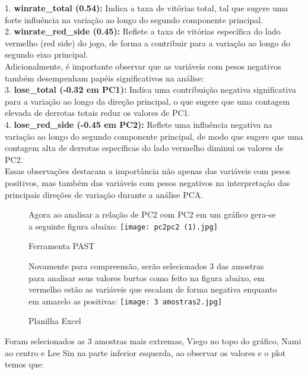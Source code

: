 \documentclass[a4paper,12pt]{article}
\begin{document}
1. \textbf{winrate\_total (0.54):} Indica a taxa de vitórias total, tal que sugere uma forte influência na variação ao longo do segundo componente principal.\\

2. \textbf{winrate\_red\_side (0.45):} Reflete a taxa de vitórias específica do lado vermelho (red side) do jogo, de forma a contribuir para a variação ao longo do segundo eixo principal.\\

Adicionalmente, é importante observar que as variáveis com pesos negativos também desempenham papéis significativos na análise:\\

3. \textbf{lose\_total (-0.32 em PC1):} Indica uma contribuição negativa significativa para a variação ao longo da direção principal, o que sugere que uma contagem elevada de derrotas totais reduz os valores de PC1.\\

4.  \textbf{lose\_red\_side (-0.45 em PC2):} Reflete uma influência negativa na variação ao longo do segundo componente principal, de modo que sugere que uma contagem alta de derrotas específicas do lado vermelho diminui os valores de PC2.\\

Essas observações destacam a importância não apenas das variáveis com pesos positivos, mas também das variáveis com pesos negativos na interpretação das principais direções de variação durante a análise PCA.
\pagebreak
\begin{figure}[h]
Agora ao analisar a relação de PC2 com PC2 em um gráfico gera-se a seguinte figura abaixo:
    \centering
    \texttt{[image: pc2pc2 (1).jpg]}
    \caption{Ferramenta PAST}
    \label{fig:enter-label}
\end{figure}
\begin{figure}[h]
Novamente para compreensão, serão selecionados 3 das amostras para analisar seus valores burtos como feito na figura abaixo, em vermelho estão as variáveis que escalam de forma negativa enquanto em amarelo as positivas:
    \centering
    \texttt{[image: 3 amostras2.jpg]}
    \caption{Planilha Excel}
    \label{fig:enter-label}
\end{figure}


Foram selecionados as 3 amostras mais extremas, Viego no topo do gráfico, Nami ao centro e Lee Sin na parte inferior esquerda, ao observar os valores e o plot temos que:\\
\end{document}
